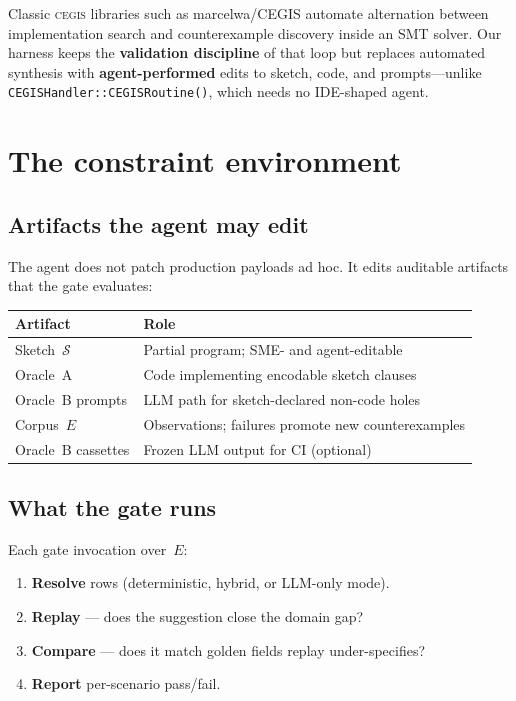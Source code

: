 \documentclass[11pt]{article}
\begin{document}
Classic \textsc{cegis} libraries such as marcelwa/CEGIS automate alternation between
implementation search and counterexample discovery inside an SMT solver.
Our harness keeps the \textbf{validation discipline} of that loop but replaces automated
synthesis with \textbf{agent-performed} edits to sketch, code, and prompts---unlike
\texttt{CEGISHandler::CEGISRoutine()}, which needs no IDE-shaped agent.

\section{The constraint environment}
\label{sec:harness}

\subsection{Artifacts the agent may edit}

The agent does not patch production payloads ad hoc. It edits auditable artifacts that
the gate evaluates:

\begin{center}
\begin{tabular}{ll}
\hline
Artifact & Role \\
\hline
Sketch~$\mathcal{S}$ & Partial program; SME- and agent-editable \\
Oracle~A & Code implementing encodable sketch clauses \\
Oracle~B prompts & LLM path for sketch-declared non-code holes \\
Corpus~$E$ & Observations; failures promote new counterexamples \\
Oracle~B cassettes & Frozen LLM output for CI (optional) \\
\hline
\end{tabular}
\end{center}

\subsection{What the gate runs}

Each gate invocation over~$E$:

\begin{enumerate}
\item \textbf{Resolve} rows (deterministic, hybrid, or LLM-only mode).
\item \textbf{Replay} --- does the suggestion close the domain gap?
\item \textbf{Compare} --- does it match golden fields replay under-specifies?
\item \textbf{Report} per-scenario pass/fail.
\end{enumerate}
\end{document}
